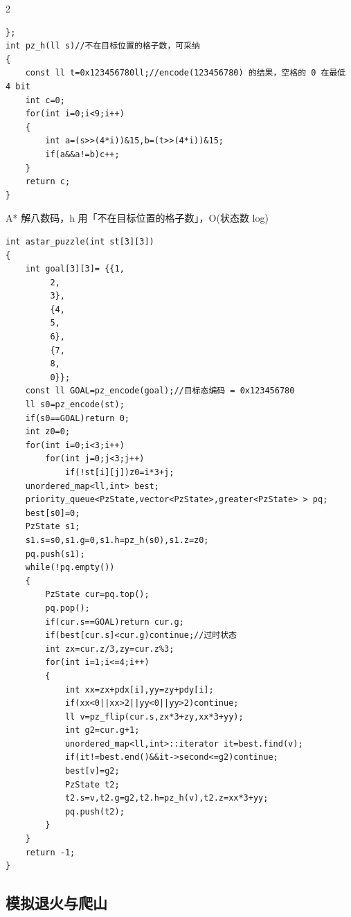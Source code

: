 \documentclass[UTF8,fontset=fandol,a4paper,twoside]{ctexart}
\newcommand{\note}[1]{{\fontsize{10}{12}\selectfont #1\par}}
\begin{document}
\begin{multicols}{2}
\begin{lstlisting}
};
int pz_h(ll s)//不在目标位置的格子数，可采纳
{
    const ll t=0x123456780ll;//encode(123456780) 的结果，空格的 0 在最低 4 bit
    int c=0;
    for(int i=0;i<9;i++)
    {
        int a=(s>>(4*i))&15,b=(t>>(4*i))&15;
        if(a&&a!=b)c++;
    }
    return c;
}
\end{lstlisting}
\note{A* 解八数码，h 用「不在目标位置的格子数」，O(\allowbreak{}状态数 log)\allowbreak{}}
\begin{lstlisting}
int astar_puzzle(int st[3][3])
{
    int goal[3][3]= {{1,
         2,
         3},
         {4,
         5,
         6},
         {7,
         8,
         0}};
    const ll GOAL=pz_encode(goal);//目标态编码 = 0x123456780
    ll s0=pz_encode(st);
    if(s0==GOAL)return 0;
    int z0=0;
    for(int i=0;i<3;i++)
        for(int j=0;j<3;j++)
            if(!st[i][j])z0=i*3+j;
    unordered_map<ll,int> best;
    priority_queue<PzState,vector<PzState>,greater<PzState> > pq;
    best[s0]=0;
    PzState s1;
    s1.s=s0,s1.g=0,s1.h=pz_h(s0),s1.z=z0;
    pq.push(s1);
    while(!pq.empty())
    {
        PzState cur=pq.top();
        pq.pop();
        if(cur.s==GOAL)return cur.g;
        if(best[cur.s]<cur.g)continue;//过时状态
        int zx=cur.z/3,zy=cur.z%3;
        for(int i=1;i<=4;i++)
        {
            int xx=zx+pdx[i],yy=zy+pdy[i];
            if(xx<0||xx>2||yy<0||yy>2)continue;
            ll v=pz_flip(cur.s,zx*3+zy,xx*3+yy);
            int g2=cur.g+1;
            unordered_map<ll,int>::iterator it=best.find(v);
            if(it!=best.end()&&it->second<=g2)continue;
            best[v]=g2;
            PzState t2;
            t2.s=v,t2.g=g2,t2.h=pz_h(v),t2.z=xx*3+yy;
            pq.push(t2);
        }
    }
    return -1;
}
\end{lstlisting}
\subsection{模拟退火与爬山}


\end{multicols}
\end{document}
